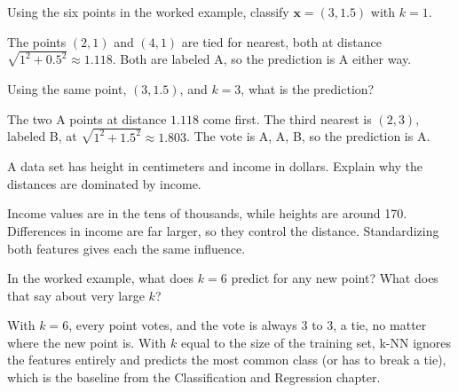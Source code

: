 \begin{Exercise}[label=knn1, title=One neighbor]
Using the six points in the worked example, classify $\mathbf{x} = (3, 1.5)$ with $k = 1$.
\end{Exercise}
\begin{Answer}[ref=knn1]
The points $(2,1)$ and $(4,1)$ are tied for nearest, both at distance $\sqrt{1^2 + 0.5^2} \approx 1.118$.
Both are labeled A, so the prediction is A either way.
\end{Answer}

\begin{Exercise}[label=knn2, title=Three neighbors]
Using the same point, $(3, 1.5)$, and $k = 3$, what is the prediction?
\end{Exercise}
\begin{Answer}[ref=knn2]
The two A points at distance $1.118$ come first. The third nearest is $(2,3)$, labeled B, at
$\sqrt{1^2 + 1.5^2} \approx 1.803$. The vote is A, A, B, so the prediction is A.
\end{Answer}

\begin{Exercise}[label=knn3, title=Why scale?]
A data set has height in centimeters and income in dollars. Explain why the distances are dominated by
income.
\end{Exercise}
\begin{Answer}[ref=knn3]
Income values are in the tens of thousands, while heights are around 170. Differences in income are far larger,
so they control the distance. Standardizing both features gives each the same influence.
\end{Answer}

\begin{Exercise}[label=knn4, title={Six neighbors}]
In the worked example, what does $k = 6$ predict for any new point? What does that say about very large $k$?
\end{Exercise}
\begin{Answer}[ref=knn4]
With $k = 6$, every point votes, and the vote is always 3 to 3, a tie, no matter where the new point is. With
$k$ equal to the size of the training set, k-NN ignores the features entirely and predicts the most common
class (or has to break a tie), which is the baseline from the Classification and Regression chapter.
\end{Answer}

